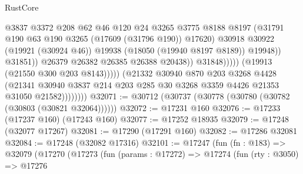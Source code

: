 \begin{lexlean}{RustCore}
\begin{coremodule}
                                            @3837
                                            @3372
                                            @208
                                            @62
                                            @46
                                            @120
                                            @24
                                            @3265
                                            @3775
                                            @8188
                                            @8197
                                            (@31791
                                              @190
                                              @63
                                              @190
                                              @3265
                                              (@17609 (@31796 @190))
                                              @17620)
                                            @30918
                                            @30922
                                            (@19921 (@30924 @46))
                                            @19938
                                            (@18050 (@19940 @8197 @8189))
                                            @19948))
                                        @31851))
                                    @26379
                                    @26382
                                    @26385
                                    @26388
                                    @20438))
                                @31848)))))
                      (@19913 (@21550 @300 @203 @8143)))))
                (@21332
                  @30940
                  @870
                  @203
                  @3268
                  @4428
                  (@21341
                    @30940
                    @3837
                    @214
                    @203
                    @285
                    @30
                    @3268
                    @3359
                    @4426
                    @21353
                    @31050
                    @21582))))))))
@32071 := @30712 (@30737 (@30778 (@30780 (@30782 (@30803 (@30821 @32064))))))
@32072 := @17231 @160
@32076 := @17233 (@17237 @160) (@17243 @160)
@32077 := @17252 @18935
@32079 := @17248 (@32077 @17267)
@32081 := @17290 (@17291 @160)
@32082 := @17286 @32081
@32084 := @17248 (@32082 @17316)
@32101 := @17247
    (fun (fn : @183) =>
    @32079
      (@17270
        (@17273
          (fun (params : @17272) =>
          @17274
            (fun (rty : @3050) =>
            @17276

\end{coremodule}
\end{lexlean}
